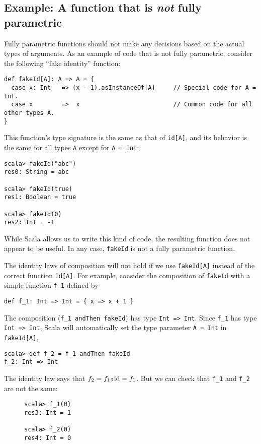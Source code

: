 \subsection{Example: A function that is \emph{not} fully parametric}

Fully parametric functions should not make any decisions based on
the actual types of arguments. As an example of code that is not fully
parametric, consider the following \textsf{``}fake identity\textsf{''} function:
\begin{lstlisting}
def fakeId[A]: A => A = {
  case x: Int   => (x - 1).asInstanceOf[A]     // Special code for A = Int.
  case x        =>  x                          // Common code for all other types A.
}
\end{lstlisting}
This function\textsf{'}s type signature is the same as that of \lstinline!id[A]!,
and its behavior is the same for all types \lstinline!A! except for
\lstinline!A = Int!:
\begin{lstlisting}
scala> fakeId("abc")
res0: String = abc

scala> fakeId(true)
res1: Boolean = true

scala> fakeId(0)
res2: Int = -1
\end{lstlisting}
While Scala allows us to write this kind of code, the resulting function
does not appear to be useful. In any case, \lstinline!fakeId! is
not a fully parametric function.

The identity laws of composition will not hold if we use \lstinline!fakeId[A]!
instead of the correct function \lstinline!id[A]!. For example, consider
the composition of \lstinline!fakeId! with a simple function \lstinline!f_1!
defined by
\begin{lstlisting}
def f_1: Int => Int = { x => x + 1 }
\end{lstlisting}
The composition (\lstinline!f_1 andThen fakeId!) has type \lstinline!Int => Int!.
Since \lstinline!f_1! has type \lstinline!Int => Int!, Scala will
automatically set the type parameter \lstinline!A = Int! in \lstinline!fakeId[A]!,
\begin{lstlisting}
scala> def f_2 = f_1 andThen fakeId
f_2: Int => Int
\end{lstlisting}
The identity law says that $f_{2}=f_{1}\bef\text{id}=f_{1}$. But
we can check that \lstinline!f_1! and \lstinline!f_2! are not the
same:

\begin{wrapfigure}{l}{0.18\columnwidth}%
\vspace{-0\baselineskip}
\begin{lstlisting}
scala> f_1(0)
res3: Int = 1

scala> f_2(0)
res4: Int = 0
\end{lstlisting}

\vspace{-0.8\baselineskip}
\end{wrapfigure}%

